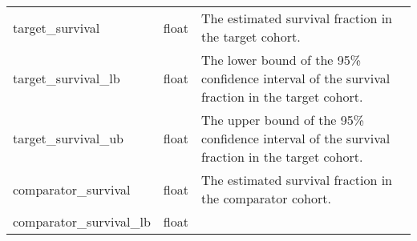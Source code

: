 \documentclass[
]{article}
\begin{document}
\begin{longtable}[]{@{}lll@{}}
\begin{minipage}[t]{0.23\columnwidth}
target\_survival\strut
\end{minipage} & \begin{minipage}[t]{0.18\columnwidth}\raggedright
float\strut
\end{minipage} & \begin{minipage}[t]{0.50\columnwidth}\raggedright
The estimated survival fraction in the target cohort.\strut
\end{minipage}\tabularnewline
\begin{minipage}[t]{0.23\columnwidth}\raggedright
target\_survival\_lb\strut
\end{minipage} & \begin{minipage}[t]{0.18\columnwidth}\raggedright
float\strut
\end{minipage} & \begin{minipage}[t]{0.50\columnwidth}\raggedright
The lower bound of the 95\% confidence interval of the survival fraction
in the target cohort.\strut
\end{minipage}\tabularnewline
\begin{minipage}[t]{0.23\columnwidth}\raggedright
target\_survival\_ub\strut
\end{minipage} & \begin{minipage}[t]{0.18\columnwidth}\raggedright
float\strut
\end{minipage} & \begin{minipage}[t]{0.50\columnwidth}\raggedright
The upper bound of the 95\% confidence interval of the survival fraction
in the target cohort.\strut
\end{minipage}\tabularnewline
\begin{minipage}[t]{0.23\columnwidth}\raggedright
comparator\_survival\strut
\end{minipage} & \begin{minipage}[t]{0.18\columnwidth}\raggedright
float\strut
\end{minipage} & \begin{minipage}[t]{0.50\columnwidth}\raggedright
The estimated survival fraction in the comparator cohort.\strut
\end{minipage}\tabularnewline
\begin{minipage}[t]{0.23\columnwidth}\raggedright
comparator\_survival\_lb\strut
\end{minipage} & \begin{minipage}[t]{0.18\columnwidth}\raggedright
float\strut
\end{minipage} & \begin{minipage}[t]{0.50\columnwidth}\raggedright

\end{minipage}
\end{longtable}
\end{document}
